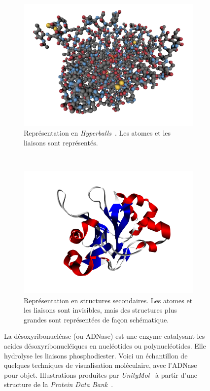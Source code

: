 \begin{figure}[H]
\begin{subfigure}[t]{\subImgW}
			\includegraphics[width=\textwidth]{./figures/ch1/4awn_HB}
			\caption{Représentation en \emph{Hyperballs}~\cite{chavent2011gpu}. Les atomes et les liaisons sont représentés.}
			\label{fig:4awn_HB}
		\end{subfigure}
		~
		\begin{subfigure}[t]{\subImgW}
			\centering
			\includegraphics[width=\textwidth]{./figures/ch1/4awn_ss}
			\caption{Représentation en structures secondaires. Les atomes et les liaisons sont invisibles, mais des structures plus grandes sont représentées de façon schématique.}
			\label{fig:4awn_ss}
		\end{subfigure}
		\caption{La désoxyribonucléase (ou ADNase) est une enzyme catalysant les acides désoxyribonucléiques en nucléotides ou polynucléotides. Elle hydrolyse les liaisons phosphodiester. Voici un échantillon de quelques techniques de visualisation moléculaire, avec l'ADNase pour objet. Illustrations produites par \emph{UnityMol}~\cite{doutreligne2014unitymol} à partir d'une structure de la \emph{Protein Data Bank}~\cite{parsiegla2012structure}.}
		\label{fig:4awn_atom}
	\end{figure}
	
